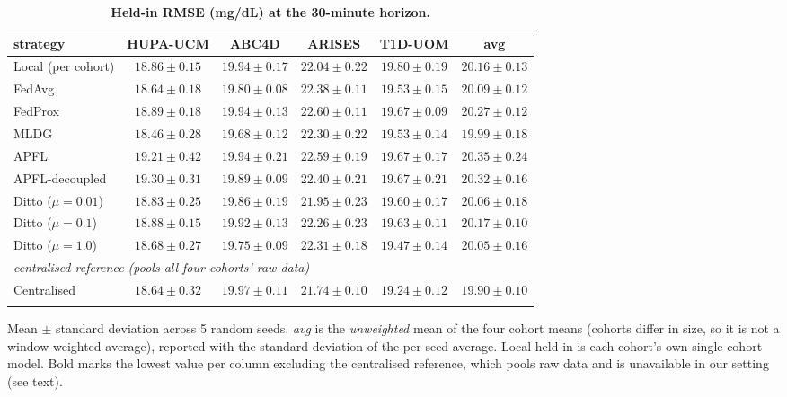 \documentclass[10pt,letterpaper]{article}
\newlength\savedwidth
\newcommand\thickhline{\noalign{\global\savedwidth\arrayrulewidth\global\arrayrulewidth 2pt}%
\hline
\noalign{\global\arrayrulewidth\savedwidth}}
\begin{document}
\begin{table}[!ht]
\centering
\captionsetup{justification=centering,singlelinecheck=on}
\caption{\bf Held-in RMSE (mg/dL) at the 30-minute horizon.}
\label{tab:main}
\begin{tabular}{lccccc}
\thickhline
strategy & HUPA-UCM & ABC4D & ARISES & T1D-UOM & avg \\
\hline
Local (per cohort) & $18.86 \pm 0.15$ & $19.94 \pm 0.17$ & $22.04 \pm 0.22$ & $19.80 \pm 0.19$ & $20.16 \pm 0.13$ \\
\hline
FedAvg  & $18.64 \pm 0.18$ & $19.80 \pm 0.08$ & $22.38 \pm 0.11$ & $19.53 \pm 0.15$ & $20.09 \pm 0.12$ \\
FedProx & $18.89 \pm 0.18$ & $19.94 \pm 0.13$ & $22.60 \pm 0.11$ & $19.67 \pm 0.09$ & $20.27 \pm 0.12$ \\
MLDG    & $\mathbf{18.46 \pm 0.28}$ & $\mathbf{19.68 \pm 0.12}$ & $22.30 \pm 0.22$ & $19.53 \pm 0.14$ & $\mathbf{19.99 \pm 0.18}$ \\
\hline
APFL           & $19.21 \pm 0.42$ & $19.94 \pm 0.21$ & $22.59 \pm 0.19$ & $19.67 \pm 0.17$ & $20.35 \pm 0.24$ \\
APFL-decoupled & $19.30 \pm 0.31$ & $19.89 \pm 0.09$ & $22.40 \pm 0.21$ & $19.67 \pm 0.21$ & $20.32 \pm 0.16$ \\
Ditto ($\mu{=}0.01$) & $18.83 \pm 0.25$ & $19.86 \pm 0.19$ & $\mathbf{21.95 \pm 0.23}$ & $19.60 \pm 0.17$ & $20.06 \pm 0.18$ \\
Ditto ($\mu{=}0.1$)  & $18.88 \pm 0.15$ & $19.92 \pm 0.13$ & $22.26 \pm 0.23$ & $19.63 \pm 0.11$ & $20.17 \pm 0.10$ \\
Ditto ($\mu{=}1.0$)  & $18.68 \pm 0.27$ & $19.75 \pm 0.09$ & $22.31 \pm 0.18$ & $\mathbf{19.47 \pm 0.14}$ & $20.05 \pm 0.16$ \\
\hline
\multicolumn{6}{l}{\emph{centralised reference (pools all four cohorts' raw data)}} \\
Centralised & $18.64 \pm 0.32$ & $19.97 \pm 0.11$ & $21.74 \pm 0.10$ & $19.24 \pm 0.12$ & $19.90 \pm 0.10$ \\
\thickhline
\end{tabular}
\begin{center}
{\small Mean $\pm$ standard deviation across 5 random seeds.
\emph{avg} is the \emph{unweighted} mean of the four cohort means (cohorts differ
in size, so it is not a window-weighted average), reported with the standard
deviation of the per-seed average. Local held-in is each cohort's own
single-cohort model. Bold marks the lowest value per column excluding the
centralised reference, which pools raw data and is unavailable in our setting
(see text).}
\end{center}
\end{table}
\end{document}
